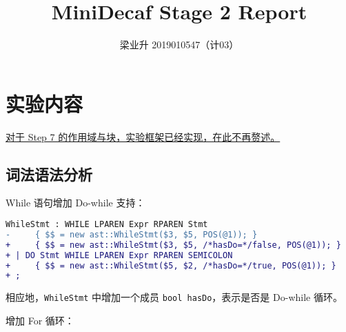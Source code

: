 \documentclass[a4paper]{article}
\author{梁业升 2019010547（计03）}
\begin{document}


\title{MiniDecaf Stage 2 Report}

\maketitle

\section{实验内容}

\underline{对于 Step 7 的作用域与块，实验框架已经实现，在此不再赘述。}

\subsection{词法语法分析}

While 语句增加 Do-while 支持：

\begin{lstlisting}[language=diff]
  WhileStmt : WHILE LPAREN Expr RPAREN Stmt
-     { $$ = new ast::WhileStmt($3, $5, POS(@1)); }
+     { $$ = new ast::WhileStmt($3, $5, /*hasDo=*/false, POS(@1)); }
+ | DO Stmt WHILE LPAREN Expr RPAREN SEMICOLON
+     { $$ = new ast::WhileStmt($5, $2, /*hasDo=*/true, POS(@1)); }
+ ;
\end{lstlisting}

相应地，\texttt{WhileStmt} 中增加一个成员 \texttt{bool hasDo}，表示是否是 Do-while 循环。

增加 For 循环：
\end{document}
